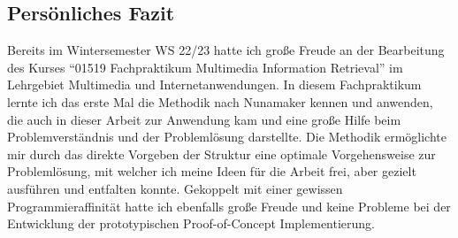 \subsection{Persönliches Fazit}
\label{sec6:disc:subsec:personal-thesis}
Bereits im Wintersemester WS 22/23 hatte ich große Freude an der Bearbeitung des Kurses \enquote{01519 Fachpraktikum Multimedia Information Retrieval} im Lehrgebiet Multimedia und Internetanwendungen.
In diesem Fachpraktikum lernte ich das erste Mal die Methodik nach Nunamaker kennen und anwenden, die auch in dieser Arbeit zur Anwendung kam und eine große Hilfe beim Problemverständnis und der Problemlösung darstellte.
Die Methodik ermöglichte mir durch das direkte Vorgeben der Struktur eine optimale Vorgehensweise zur Problemlösung, mit welcher ich meine Ideen für die Arbeit frei, aber gezielt ausführen und entfalten konnte.
Gekoppelt mit einer gewissen Programmieraffinität hatte ich ebenfalls große Freude und keine Probleme bei der Entwicklung der prototypischen Proof-of-Concept Implementierung.

